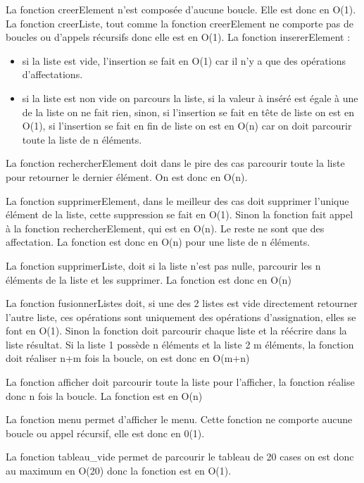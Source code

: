 \documentclass[11pt]{report}
\begin{document}
La fonction creerElement n'est composée d'aucune boucle. Elle est donc en O(1).
\medskip
La fonction creerListe, tout comme la fonction creerElement ne comporte pas de boucles ou d'appels récursifs donc elle est en O(1).
\medskip
La fonction insererElement :
\begin{itemize}
	\item si la liste est vide, l'insertion se fait en O(1) car il n'y a que des opérations d'affectations.
	\item si la liste est non vide on parcours la liste, si la valeur à inséré est égale à une de la liste on ne fait rien, sinon, si l'insertion se fait en tête de liste on est en O(1), si l'insertion se fait en fin de liste on est en O(n) car on doit parcourir toute la liste de n éléments.

\end{itemize}


\medskip

La fonction rechercherElement doit dans le pire des cas parcourir toute la liste pour retourner le dernier élément. On est donc en O(n).

\medskip

La fonction supprimerElement, dans le meilleur des cas doit supprimer l'unique élément de la liste, cette suppression se fait en O(1). Sinon la fonction fait appel à la fonction rechercherElement, qui est en O(n). Le reste ne sont que des affectation. La fonction est donc en O(n) pour une liste de n éléments.

\medskip

La fonction supprimerListe, doit si la liste n'est pas nulle, parcourir les n éléments de la liste et les supprimer. La fonction est donc en O(n)

\medskip

La fonction fusionnerListes doit, si une des 2 listes est vide directement retourner l'autre liste, ces opérations sont uniquement des opérations d’assignation, elles se font en O(1). Sinon la fonction doit parcourir chaque liste et la réécrire dans la liste résultat. Si la liste 1 possède n éléments et la liste 2 m éléments, la fonction doit réaliser n+m fois la boucle, on est donc en O(m+n)

\medskip

La fonction afficher doit parcourir toute la liste pour l'afficher, la fonction réalise donc n fois la boucle. La fonction est en O(n)

\medskip

La fonction menu permet d'afficher le menu. Cette fonction ne comporte aucune boucle ou appel récursif, elle est donc en 0(1).

\medskip

La fonction tableau\_vide permet de parcourir le tableau de 20 cases on est donc au maximum en O(20) donc la fonction est en O(1).
\end{document}
